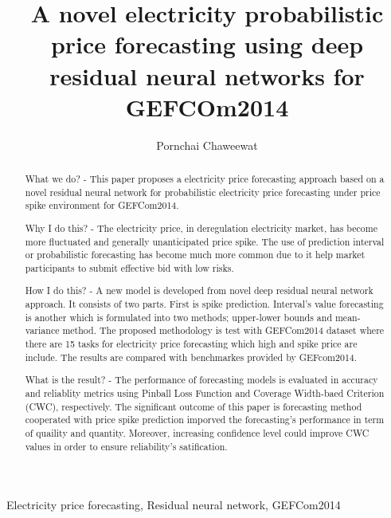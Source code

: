 \documentclass[review]{elsarticle}
\begin{document}
\begin{frontmatter}

\title{A novel electricity probabilistic price forecasting using deep residual neural networks for GEFCOm2014}

\author{Pornchai Chaweewat}

\address{AIT}

%
%

\begin{abstract}
What we do? - This paper proposes a electricity price forecasting approach based on a novel residual neural network for probabilistic electricity price forecasting under price spike environment for GEFCom2014.

Why I do this? - The electricity price, in deregulation electricity market, has become more fluctuated and generally unanticipated price spike. The use of prediction interval or probabilistic forecasting has become much more common due to it help market participants to submit effective bid with low risks.

How I do this? - A new model is developed from novel deep residual neural network approach. It consists of two parts. First is spike prediction. Interval's value forecasting is another which is formulated into two methods; upper-lower bounds and mean-variance method. The proposed methodology is test with GEFCom2014 dataset where there are 15 tasks for electricity price forecasting which high and spike price are include. The results are compared with benchmarkes provided by GEFcom2014.

What is the result? - The performance of forecasting models is evaluated in accuracy and reliablity metrics using Pinball Loss Function and Coverage Width-baed Criterion (CWC), respectively. The significant outcome of this paper is forecasting method cooperated with price spike prediction imporved the forecasting's performance in term of quaility and quantity. Moreover, increasing confidence level could improve CWC values in order to ensure reliability's satification.

\end{abstract}

\begin{keyword}
Electricity price forecasting, Residual neural network, GEFCom2014
\end{keyword}

\end{frontmatter}
\end{document}
